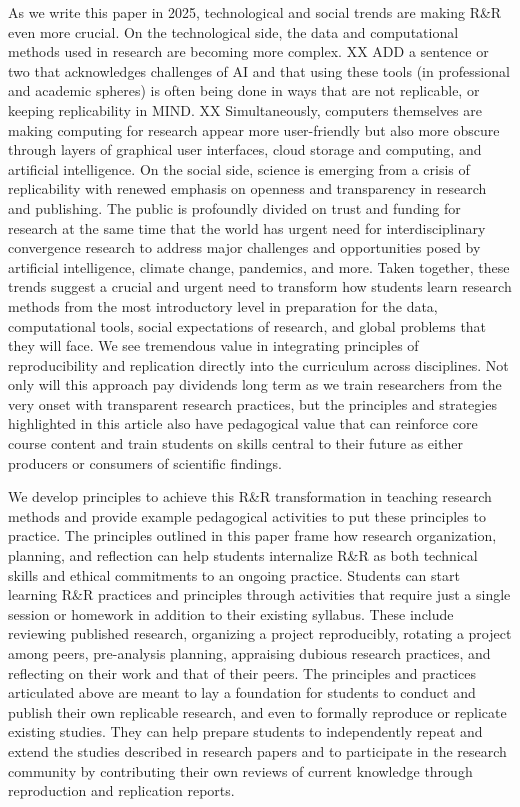\documentclass[
  12pt]{article}
\begin{document}
As we write this paper in 2025, technological and social trends are making R\&R even more crucial.
On the technological side, the data and computational methods used in research are becoming more complex.
XX ADD a sentence or two that acknowledges challenges of AI and that using these tools (in professional and academic spheres) is often being done in ways that are not replicable, or keeping replicability in MIND. XX
Simultaneously, computers themselves are making computing for research appear more user-friendly but also more obscure through layers of graphical user interfaces, cloud storage and computing, and artificial intelligence. 
On the social side, science is emerging from a crisis of replicability with renewed emphasis on openness and transparency in research and publishing.
The public is profoundly divided on trust and funding for research at the same time that the world has urgent need for interdisciplinary convergence research to address major challenges and opportunities posed by artificial intelligence, climate change, pandemics, and more.
Taken together, these trends suggest a crucial and urgent need to transform how students learn research methods from the most introductory level in preparation for the data, computational tools, social expectations of research, and global problems that they will face.
We see tremendous value in integrating principles of reproducibility and replication directly into the curriculum across disciplines.
Not only will this approach pay dividends long term as we train researchers from the very onset with transparent research practices, but the principles and strategies highlighted in this article also have pedagogical value that can reinforce core course content and train students on skills central to their future as either producers or consumers of scientific findings.

We develop principles to achieve this R\&R transformation in teaching research methods and provide example pedagogical activities to put these principles to practice.
The principles outlined in this paper frame how research organization, planning, and reflection can help students internalize R\&R as both technical skills and ethical commitments to an ongoing practice.
Students can start learning R\&R practices and principles through activities that require just a single session or homework in addition to their existing syllabus.
These include reviewing published research, organizing a project reproducibly, rotating a project among peers, pre-analysis planning, appraising dubious research practices, and reflecting on their work and that of their peers.
The principles and practices articulated above are meant to lay a foundation for students to conduct and publish their own replicable research, and even to formally reproduce or replicate existing studies. 
They can help prepare students to independently repeat and extend the studies described in research papers and to participate in the research community by contributing their own reviews of current knowledge through reproduction and replication reports.
\end{document}
